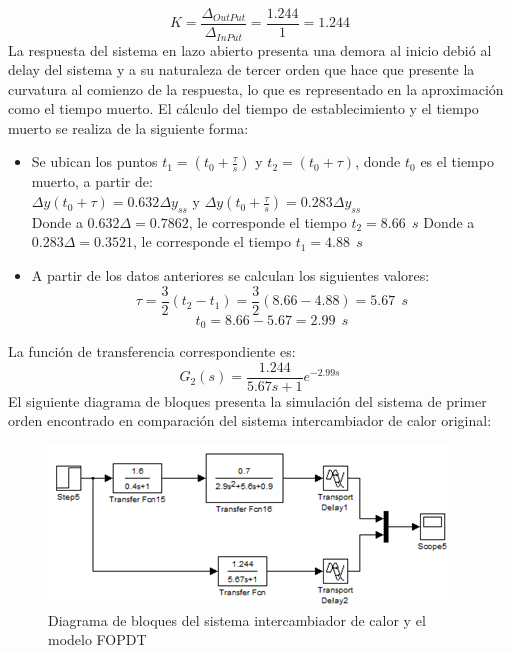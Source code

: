 \documentclass[twocolumn]{IEEEtran}
\begin{document}
\begin{equation}
 K = \frac{{\Delta _{OutPut} }}{{\Delta _{InPut} }} = \frac{{1.244}}{1} = 1.244
\label{ecu102}
\end{equation}
\noindent
La respuesta del sistema en lazo abierto presenta una demora al inicio debió al delay del sistema y a su naturaleza de tercer orden que hace que presente la curvatura al comienzo de la respuesta, lo que es representado en la aproximación como el tiempo muerto. El cálculo del tiempo de establecimiento y el tiempo muerto se realiza de la siguiente forma:
\begin{itemize}
 \item Se ubican los puntos $t_1  = \left( {t_0  + \frac{\tau }{s}} \right)$ y $t_2  = \left( {t_0  + \tau} \right)$, donde $t_0$ es el tiempo muerto, a partir de:\\
$\Delta y\left( {t_0  + \tau } \right) = 0.632\Delta y_{ss}$ y $\Delta y\left( {t_0  + \frac{\tau }{s}} \right) = 0.283\Delta y_{ss}$\\
Donde a $0.632\Delta =0.7862$, le corresponde el tiempo $t_2=8.66\ \ s$
Donde a $0.283\Delta =0.3521$, le corresponde el tiempo $t_1=4.88\ \ s$
 \item A partir de los datos anteriores se calculan los siguientes valores:\\
$$\tau  = \frac{3}{2}\left( {t_2  - t_1 } \right) = \frac{3}{2}\left( {8.66 - 4.88} \right) = 5.67\ \ s$$
$$t_0  = 8.66 - 5.67 = 2.99\ \ s$$
\end{itemize}
\noindent
La función de transferencia correspondiente es:
\begin{equation}
 G_{2}\left( s \right) = \frac{{1.244}}{{5.67s + 1}}e^{ - 2.99s}
\label{ecu103}
\end{equation}
\noindent
El siguiente diagrama de bloques presenta la simulación del sistema de primer orden encontrado en comparación del sistema intercambiador de calor original:
\begin{figure}[H]
	\centering
		\includegraphics[scale=0.5]{block.png}
	\caption{Diagrama de bloques del sistema intercambiador de calor y el modelo FOPDT}
	\label{fig13}
\end{figure}
\end{document}
